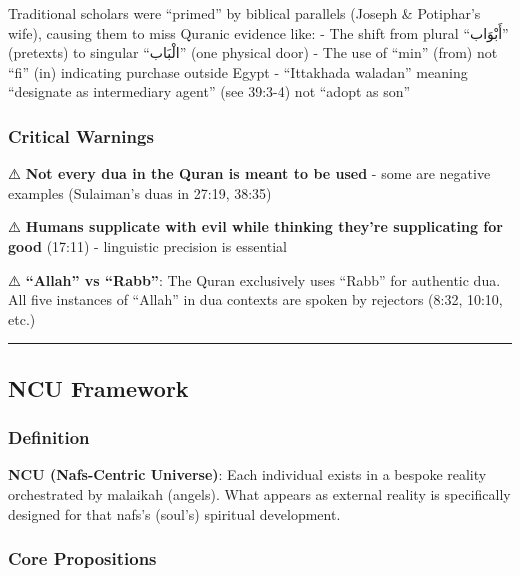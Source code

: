 \documentclass[12pt,a4paper]{article}
\begin{document}
Traditional scholars were ``primed'' by biblical parallels (Joseph \&
Potiphar's wife), causing them to miss Quranic evidence like: - The
shift from plural ``أَبْوَاب'' (pretexts) to singular ``الْبَاب'' (one
physical door) - The use of ``min'' (from) not ``fi'' (in) indicating
purchase outside Egypt - ``Ittakhada waladan'' meaning ``designate as
intermediary agent'' (see 39:3-4) not ``adopt as son''

\subsubsection{Critical Warnings}\label{critical-warnings}

⚠️ \textbf{Not every dua in the Quran is meant to be used} - some are
negative examples (Sulaiman's duas in 27:19, 38:35)

⚠️ \textbf{Humans supplicate with evil while thinking they're
supplicating for good} (17:11) - linguistic precision is essential

⚠️ \textbf{``Allah'' vs ``Rabb''}: The Quran exclusively uses ``Rabb''
for authentic dua. All five instances of ``Allah'' in dua contexts are
spoken by rejectors (8:32, 10:10, etc.)

\begin{center}\rule{0.5\linewidth}{0.5pt}\end{center}

\subsection{NCU Framework}\label{ncu-framework}

\subsubsection{Definition}\label{definition}

\textbf{NCU (Nafs-Centric Universe)}: Each individual exists in a
bespoke reality orchestrated by malaikah (angels). What appears as
external reality is specifically designed for that nafs's (soul's)
spiritual development.

\subsubsection{Core Propositions}\label{core-propositions}
\end{document}

